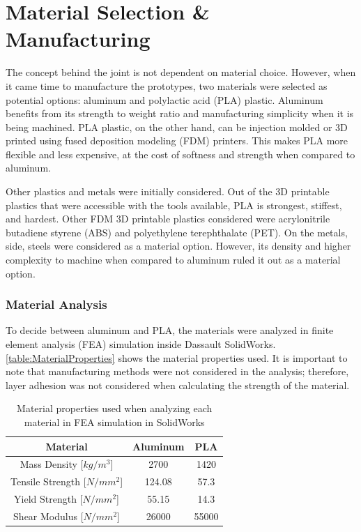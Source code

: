 
\section{Material Selection \& Manufacturing}

The concept behind the joint is not dependent on material choice. However, when it came time to manufacture the prototypes, two materials were selected as potential options: aluminum and polylactic acid (PLA) plastic. Aluminum benefits from its strength to weight ratio and manufacturing simplicity when it is being machined. PLA plastic, on the other hand, can be injection molded or 3D printed using fused deposition modeling (FDM) printers. This makes PLA more flexible and less expensive, at the cost of softness and strength when compared to aluminum.

Other plastics and metals were initially considered. Out of the 3D printable plastics that were accessible with the tools available, PLA is strongest, stiffest, and hardest. Other FDM 3D printable plastics considered were  acrylonitrile butadiene styrene (ABS) and polyethylene terephthalate (PET). On the metals, side, steels were considered as a material option. However, its density and higher complexity to machine when compared to aluminum ruled it out as a material option.

\subsubsection{Material Analysis}
To decide between aluminum and PLA, the materials were analyzed in finite element analysis (FEA) simulation inside Dassault SolidWorks. \autoref{table:MaterialProperties} shows the material properties used. It is important to note that manufacturing methods were not considered in the analysis; therefore, layer adhesion was not considered when calculating the strength of the material.

\begin{table}
    \centering
    \begin{tabular}{ |c|c|c| }
        \hline
        Material & Aluminum & PLA \\
        \hline \hline
        Mass Density [$kg/m^3$] & 2700 & 1420 \\
        \hline
        Tensile Strength [$N/mm^2$] & 124.08 & 57.3\\
        \hline
        Yield Strength [$N/mm^2$] & 55.15 & 14.3\\ 
        \hline
        Shear Modulus [$N/mm^2$] & 26000 & 55000\\
        \hline
    \end{tabular}
    \caption{Material properties used when analyzing each material in FEA simulation in SolidWorks}
    \label{table:MaterialProperties}
\end{table}

